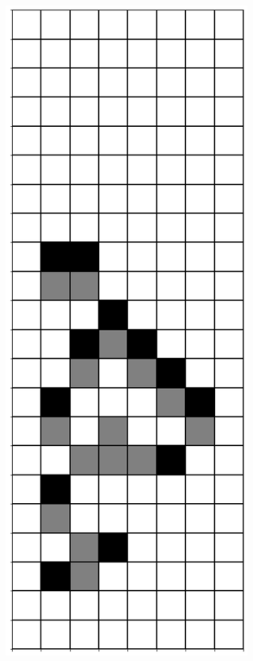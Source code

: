 \documentclass[12pt]{article}
\numberwithin{figure}{section} %
\begin{document}
\begin{figure}[H]
\begin{subfigure}{0.19\textwidth}
     \subcaption{}
   \end{subfigure}
     \begin{subfigure}{0.19\textwidth}
     \centering
     \includegraphics[width=\linewidth]{Section4/28.1}

\end{subfigure}
\end{figure}
\end{document}
